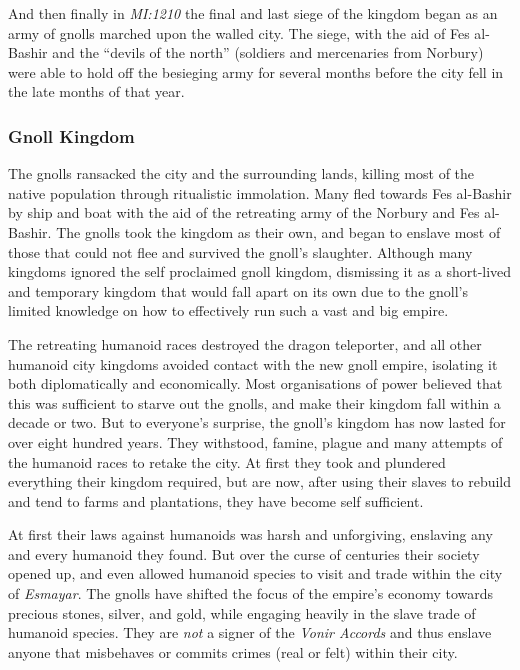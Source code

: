 And then finally in \emph{MI:1210} the final and last siege of the kingdom
began as an army of gnolls marched upon the walled city. The siege, with the
aid of Fes al-Bashir and the ``devils of the north'' (soldiers and mercenaries
from Norbury) were able to hold off the besieging army for several months before
the city fell in the late months of that year.

\subsubsection*{Gnoll Kingdom}

The gnolls ransacked the city and the surrounding lands, killing most of the
native population through ritualistic immolation. Many fled towards Fes
al-Bashir by ship and boat with the aid of the retreating army of the Norbury
and Fes al-Bashir. The gnolls took the kingdom as their own, and began to
enslave most of those that could not flee and survived the gnoll's
slaughter. Although many kingdoms ignored the self proclaimed gnoll kingdom,
dismissing it as a short-lived and temporary kingdom that would fall apart on
its own due to the gnoll's limited knowledge on how to effectively run such a
vast and big empire.

The retreating humanoid races destroyed the dragon teleporter, and all other
humanoid city kingdoms avoided contact with the new gnoll empire, isolating it
both diplomatically and economically. Most organisations of power believed
that this was sufficient to starve out the gnolls, and make their kingdom fall
within a decade or two. But to everyone's surprise, the gnoll's kingdom has
now lasted for over eight hundred years. They withstood, famine, plague and
many attempts of the humanoid races to retake the city. At first they took and
plundered everything their kingdom required, but are now, after using their
slaves to rebuild and tend to farms and plantations, they have become self
sufficient.

At first their laws against humanoids was harsh and unforgiving, enslaving any
and every humanoid they found. But over the curse of centuries their society
opened up, and even allowed humanoid species to visit and trade within the
city of \emph{Esmayar}. The gnolls have shifted the focus of the empire's
economy towards precious stones, silver, and gold, while engaging heavily in
the slave trade of humanoid species. They are \emph{not} a signer of the
\emph{Vonir Accords} and thus enslave anyone that misbehaves or commits crimes
(real or felt) within their city.

